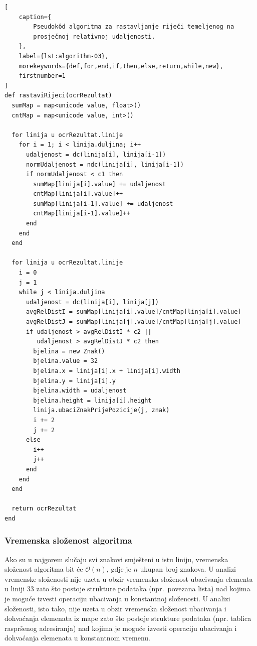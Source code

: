 \documentclass[times, utf8, zavrsni]{fer}
\begin{document}
\begin{lstlisting}[
    caption={
        Pseudokôd algoritma za rastavljanje riječi temeljenog na
        prosječnoj relativnoj udaljenosti.
    },
    label={lst:algorithm-03},
    morekeywords={def,for,end,if,then,else,return,while,new},
    firstnumber=1
]
def rastaviRijeci(ocrRezultat)
  sumMap = map<unicode value, float>()
  cntMap = map<unicode value, int>()

  for linija u ocrRezultat.linije
    for i = 1; i < linija.duljina; i++
      udaljenost = dc(linija[i], linija[i-1])
      normUdaljenost = ndc(linija[i], linija[i-1])
      if normUdaljenost < c1 then
        sumMap[linija[i].value] += udaljenost
        cntMap[linija[i].value]++
        sumMap[linija[i-1].value] += udaljenost
        cntMap[linija[i-1].value]++
      end
    end
  end

  for linija u ocrRezultat.linije
    i = 0
    j = 1
    while j < linija.duljina
      udaljenost = dc(linija[i], linija[j])
      avgRelDistI = sumMap[linija[i].value]/cntMap[linja[i].value]
      avgRelDistJ = sumMap[linija[j].value]/cntMap[linja[j].value]
      if udaljenost > avgRelDistI * c2 ||
         udaljenost > avgRelDistJ * c2 then
        bjelina = new Znak()
        bjelina.value = 32
        bjelina.x = linija[i].x + linija[i].width
        bjelina.y = linija[i].y
        bjelina.width = udaljenost
        bjelina.height = linija[i].height
        linija.ubaciZnakPrijePozicije(j, znak)
        i += 2
        j += 2
      else
        i++
        j++
      end
    end
  end

  return ocrRezultat
end
\end{lstlisting}


\subsubsection{Vremenska složenost algoritma}
Ako su u najgorem slučaju svi znakovi smješteni u istu liniju, vremenska
složenost algoritma bit će $\mathcal{O}(n)$, gdje je $n$ ukupan broj
znakova. U analizi vremenske složenosti nije uzeta u obzir vremenska složenost
ubacivanja elementa u liniji $33$ zato što postoje strukture podataka
(npr.\ povezana lista) nad kojima je moguće izvesti operaciju ubacivanja u
konstantnoj složenosti. U analizi složenosti, isto tako, nije uzeta u obzir
vremenska složenost ubacivanja i dohvaćanja elemenata iz mape zato što
postoje strukture podataka (npr. tablica raspršenog adresiranja) nad kojima je
moguće izvesti operaciju ubacivanja i dohvaćanja elemenata u konstantnom
vremenu.
\end{document}
